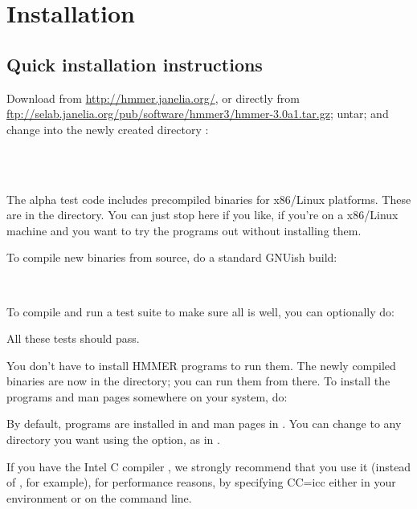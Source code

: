 \section{Installation}
\label{section:installation}

\subsection{Quick installation instructions}

Download  from
\url{http://hmmer.janelia.org/}, or directly from
\url{ftp://selab.janelia.org/pub/software/hmmer3/hmmer-3.0a1.tar.gz};
untar; and change into the newly created directory :

\\
\\

The alpha test code includes precompiled binaries for x86/Linux
platforms. These are in the  directory. You can just
stop here if you like, if you're on a x86/Linux machine and you want
to try the programs out without installing them.

To compile new binaries from source, do a standard GNUish build:

\\ 

To compile and run a test suite to make sure all is well, you can
optionally do:


All these tests should pass.

You don't have to install HMMER programs to run them. The newly
compiled binaries are now in the  directory; you can run
them from there. To install the programs and man pages somewhere on
your system, do:


By default, programs are installed in  and man
pages in . You can change 
to any directory you want using the 
option, as in .

If you have the Intel C compiler , we strongly recommend
that you use it (instead of , for example), for performance
reasons, by specifying {CC=icc} either in your environment or on the
 command line. 

